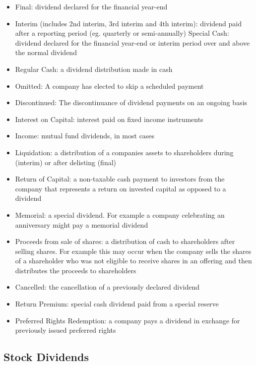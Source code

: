 \documentclass[10pt,preprint, authoryear]{elsarticle}
\numberwithin{equation}{section}
\numberwithin{figure}{section}
\numberwithin{table}{section}
\def\tightlist{} %
\begin{document}
\begin{itemize}
\tightlist
\item
  Final: dividend declared for the financial year-end
\item
  Interim (includes 2nd interim, 3rd interim and 4th interim): dividend
  paid after a reporting period (eg. quarterly or semi-annually) Special
  Cash: dividend declared for the financial year-end or interim period
  over and above the normal dividend
\item
  Regular Cash: a dividend distribution made in cash
\item
  Omitted: A company has elected to skip a scheduled payment
\item
  Discontinued: The discontinuance of dividend payments on an ongoing
  basis
\item
  Interest on Capital: interest paid on fixed income instruments
\item
  Income: mutual fund dividends, in most cases
\item
  Liquidation: a distribution of a companies assets to shareholders
  during (interim) or after delisting (final)
\item
  Return of Capital: a non-taxable cash payment to investors from the
  company that represents a return on invested capital as opposed to a
  dividend
\item
  Memorial: a special dividend. For example a company celebrating an
  anniversary might pay a memorial dividend
\item
  Proceeds from sale of shares: a distribution of cash to shareholders
  after selling shares. For example this may occur when the company
  sells the shares of a shareholder who was not eligible to receive
  shares in an offering and then distributes the proceeds to
  shareholders
\item
  Cancelled: the cancellation of a previously declared dividend
\item
  Return Premium: special cash dividend paid from a special reserve
\item
  Preferred Rights Redemption: a company pays a dividend in exchange for
  previously issued preferred rights
\end{itemize}

\hypertarget{stock-dividends}{%
\subsection*{Stock Dividends}\label{stock-dividends}}
\end{document}
